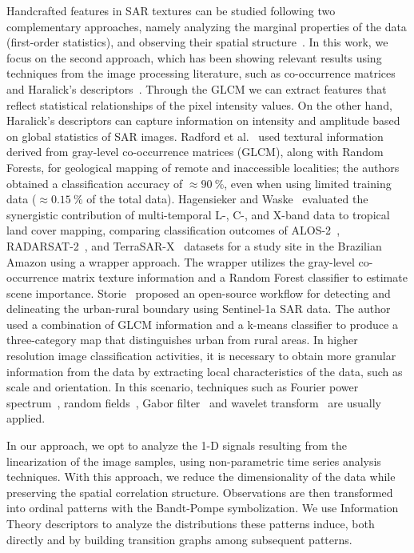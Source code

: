 \documentclass[journal]{IEEEtran}
\begin{document}
Handcrafted features in SAR textures can be studied following two complementary approaches, namely analyzing the marginal properties of the data (first-order statistics), and observing their spatial structure~\cite{Yue2020Gaussian, numbisi2018multi}.
In this work, we focus on the second approach, which has been showing relevant results using techniques from the image processing literature, such as co-occurrence matrices and Haralick's descriptors~\cite{yu2019detection}.
Through the GLCM we can extract features that reflect statistical relationships of the pixel intensity values.
On the other hand, Haralick's descriptors can capture information on intensity and amplitude based on global statistics of SAR images.
Radford et al.~\cite{radford2018geological} used textural information derived from gray-level co-occurrence matrices (GLCM), along with Random Forests, for geological mapping of remote and inaccessible localities; the authors obtained a classification accuracy of $\approx\SI{90}{\percent}$, even when using limited training data ($\approx\SI{0.15}{\percent}$ of the total data). 	
Hagensieker and Waske~\cite{hagensieker2018evaluation} evaluated the synergistic contribution of multi-temporal L-, C-, and X-band data to tropical land cover mapping, comparing classification outcomes of ALOS-2~\cite{kankaku2013alos}, RADARSAT-2~\cite{morena2004introduction}, and TerraSAR-X~\cite{breit2009terrasar} datasets for a study site in the Brazilian Amazon using a wrapper approach. 
The wrapper utilizes the gray-level co-occurrence matrix texture information and a  Random Forest classifier to estimate scene importance. 	
Storie~\cite{storie2018urban} proposed an open-source workflow for detecting and delineating the urban-rural boundary using Sentinel-1a SAR data.
The author used a combination of GLCM information and a k-means classifier to produce a three-category map that distinguishes urban from rural areas. 
In higher resolution image classification activities, it is necessary to obtain more granular information from the data by extracting local characteristics of the data, such as scale and orientation.
In this scenario, techniques such as Fourier power spectrum~\cite{Florindo2012Fractal}, random fields~\cite{zhu2016antarctic}, Gabor filter~\cite{dumitru2014information} and wavelet transform~\cite{akbarizadeh2012new} are usually applied.

In our approach, we opt to analyze the \mbox{1-D} signals resulting from the linearization of the image samples, using non-parametric time series analysis techniques.
With this approach, we reduce the dimensionality of the data while preserving the spatial correlation structure.
Observations are then transformed into ordinal patterns with the Bandt-Pompe symbolization.
We use Information Theory descriptors to analyze the distributions these patterns induce, both directly and by building transition graphs among subsequent patterns.
\end{document}
